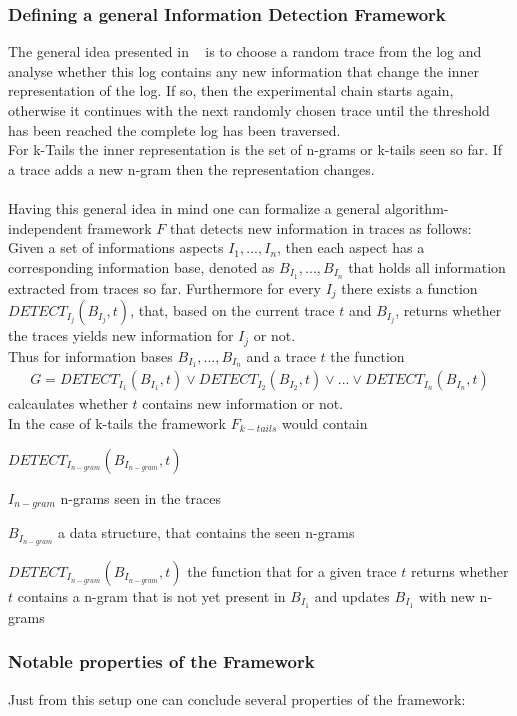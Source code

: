 \documentclass[
	a4paper,
	pagesize,
	pdftex,
	12pt,
	twoside, %
	BCOR=5mm, %
	ngerman,
	fleqn,
	final,
	]{scrartcl}
\begin{document}
\subsubsection{Defining a general Information Detection Framework}
The general idea presented in ~\cite{PartialLogAnalysis} is to choose a random trace from the log and analyse whether this log contains any new information that change the inner representation of the log. If so, then the experimental chain starts again, otherwise it continues with the next randomly chosen trace until the threshold has been reached the complete log has been traversed.\\ 
For k-Tails the inner representation is the set of n-grams or k-tails seen so far. If a trace adds a new n-gram then the representation changes.\\\\
Having this general idea in mind one can formalize a general algorithm-independent framework $F$ that detects new information in traces as follows:\\
Given a set of informations aspects $I_1,...,I_n$, then each aspect has a corresponding information base, denoted as $B_{I_1},...,B_{I_n}$ that holds all information extracted from traces so far. Furthermore for every $I_j$ there exists a function $DETECT_{I_j}(B_{I_j}, t)$, that, based on the current trace $t$ and $B_{I_j}$, returns whether the traces yields new information for $I_j$ or not.\\
Thus for information bases $B_{I_1},...,B_{I_n}$ and a trace $t$ the function
\begin{align*}
G = DETECT_{I_1}(B_{I_1},t) \vee DETECT_{I_2}(B_{I_2},t) \vee ... \vee DETECT_{I_n}(B_{I_n},t)
\end{align*}
calcaulates whether $t$ contains new information or not.\\
In the case of k-tails the framework $F_{k-tails}$ would contain
\begin{labeling}{$DETECT_{I_{n-gram}}(B_{I_{n-gram}},t)$}
	\item[$I_{n-gram}$] n-grams seen in the traces
	\item[$B_{I_{n-gram}}$] a data structure, that contains the seen n-grams
	\item[$DETECT_{I_{n-gram}}(B_{I_{n-gram}},t)$] the function that for a given trace $t$ returns whether $t$ contains a n-gram that is not yet present in $B_{I_1}$ and updates $B_{I_1}$ with new n-grams
\end{labeling}
\subsubsection{Notable properties of the Framework}
Just from this setup one can conclude several properties of the framework:
\end{document}
